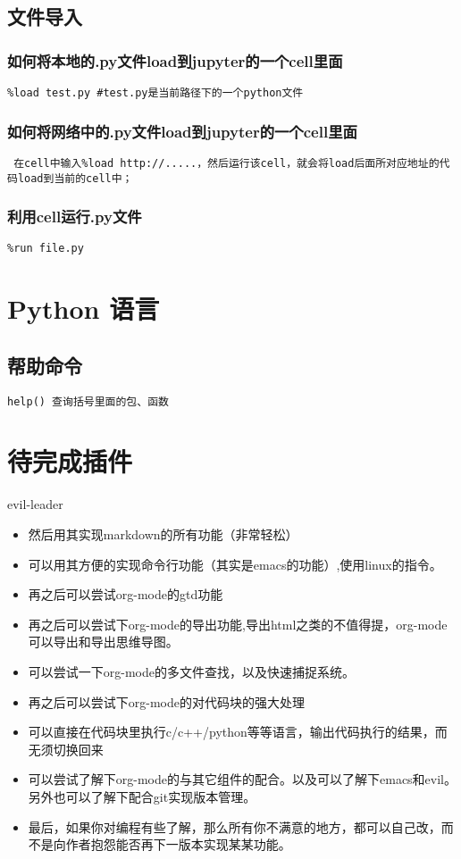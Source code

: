 \documentclass[11pt]{article}
\begin{document}
\subsection{文件导入}
\label{sec:org4580a48}
\subsubsection{如何将本地的.py文件load到jupyter的一个cell里面}
\label{sec:org04c4e5e}
\begin{verbatim}
%load test.py #test.py是当前路径下的一个python文件
\end{verbatim}
\subsubsection{如何将网络中的.py文件load到jupyter的一个cell里面}
\label{sec:orgf932565}
\begin{verbatim}
 在cell中输入%load http://.....，然后运行该cell，就会将load后面所对应地址的代码load到当前的cell中；
\end{verbatim}
\subsubsection{利用cell运行.py文件}
\label{sec:org13f1b55}
\begin{verbatim}
%run file.py
\end{verbatim}
\section{Python 语言}
\label{sec:org36eb3a6}
\subsection{帮助命令}
\label{sec:org055ef64}
\begin{verbatim}
help() 查询括号里面的包、函数
\end{verbatim}
\section{待完成插件}
\label{sec:org6baf975}
evil-leader
\begin{itemize}
\item 然后用其实现markdown的所有功能（非常轻松）
\item 可以用其方便的实现命令行功能（其实是emacs的功能）,使用linux的指令。
\item 再之后可以尝试org-mode的gtd功能
\item 再之后可以尝试下org-mode的导出功能,导出html之类的不值得提，org-mode可以导出和导出思维导图。
\item 可以尝试一下org-mode的多文件查找，以及快速捕捉系统。
\item 再之后可以尝试下org-mode的对代码块的强大处理
\item 可以直接在代码块里执行c/c++/python等等语言，输出代码执行的结果，而无须切换回来
\item 可以尝试了解下org-mode的与其它组件的配合。以及可以了解下emacs和evil。另外也可以了解下配合git实现版本管理。
\item 最后，如果你对编程有些了解，那么所有你不满意的地方，都可以自己改，而不是向作者抱怨能否再下一版本实现某某功能。
\end{itemize}
\end{document}

